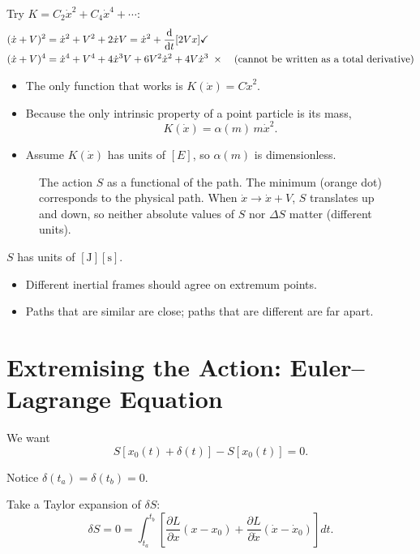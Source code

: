 Try $K = C_2 \dot{x}^2 + C_4 \dot{x}^4 + \cdots$:
\begin{align*}
    (\dot{x} + V)^2 &= \dot{x}^2 + V^2 + 2\dot{x}V = \dot{x}^2 + \dv{t}[2Vx] \checkmark \\
    (\dot{x} + V)^4 &= \dot{x}^4 + V^4 + 4\dot{x}^3 V + 6V^2\dot{x}^2 + 4V\dot{x}^3 \;\times
        \quad \text{(cannot be written as a total derivative)}
\end{align*}

\begin{itemize}
    \item The only function that works is $K(\dot{x}) = C\dot{x}^2$.
    \item Because the only intrinsic property of a point particle is its mass,
        \[
            K(\dot{x}) = \alpha(m)\,m\dot{x}^2.
        \]
    \item Assume $K(\dot{x})$ has units of $[E]$, so $\alpha(m)$ is dimensionless.
\end{itemize}

\begin{figure}[H]
    \centering
    \caption{The action $S$ as a functional of the path. The minimum (orange dot)
    corresponds to the physical path. When $\dot{x} \to \dot{x}+V$, $S$ translates
    up and down, so neither absolute values of $S$ nor $\Delta S$ matter (different
    units).}
\end{figure}

$S$ has units of $[\text{J}][\text{s}]$.

\begin{itemize}
    \item Different inertial frames should agree on extremum points.
    \item Paths that are similar are close; paths that are different are far apart.
\end{itemize}

\section{Extremising the Action: Euler–Lagrange Equation}

We want
\[
    S[x_0(t) + \delta(t)] - S[x_0(t)] = 0.
\]

Notice $\delta(t_a) = \delta(t_b) = 0$.

Take a Taylor expansion of $\delta S$:
\[
    \delta S = 0 = \int_{t_a}^{t_b}
    \left[\frac{\partial L}{\partial x}(x - x_0)
    + \frac{\partial L}{\partial \dot{x}}(\dot{x} - \dot{x}_0)\right]dt.
\]

